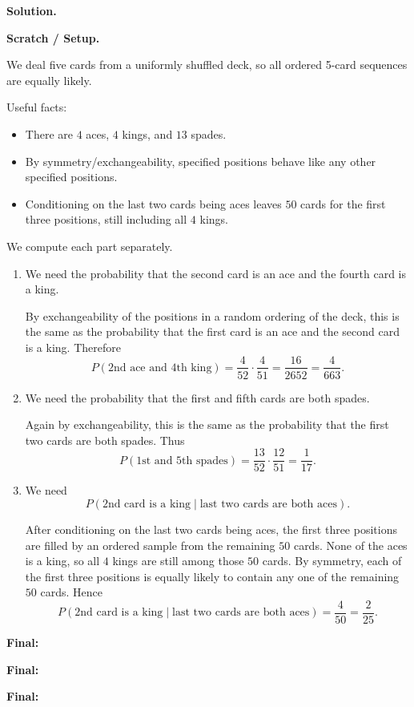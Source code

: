 \documentclass[12pt]{article}
\newenvironment{solution}{%
  \noindent\textbf{Solution.}\ \ignorespaces
}{\par}
\newenvironment{scratch}{%
  \begin{boxnote}\textbf{Scratch / Setup.}\ \small
}{\end{boxnote}}
\newcommand{\finalanswer}[1]{%
  \par\medskip
  \noindent\textbf{Final:}\ \fbox{$#1$}\par
} %
\begin{document}
\begin{solution}

\begin{scratch}
We deal five cards from a uniformly shuffled deck, so all ordered 5-card sequences
are equally likely.

Useful facts:
\begin{itemize}
  \item There are $4$ aces, $4$ kings, and $13$ spades.
  \item By symmetry/exchangeability, specified positions behave like any other
  specified positions.
  \item Conditioning on the last two cards being aces leaves $50$ cards for the
  first three positions, still including all $4$ kings.
\end{itemize}
\end{scratch}

We compute each part separately.

\begin{enumerate}[label=\textbf{(\alph*)}]
  \item We need the probability that the second card is an ace and the fourth card
  is a king.

  By exchangeability of the positions in a random ordering of the deck, this is the
  same as the probability that the first card is an ace and the second card is a king.
  Therefore
  \[
  P(\text{2nd ace and 4th king})
  =\frac{4}{52}\cdot\frac{4}{51}
  =\frac{16}{2652}
  =\frac{4}{663}.
  \]

  \item We need the probability that the first and fifth cards are both spades.

  Again by exchangeability, this is the same as the probability that the first two
  cards are both spades. Thus
  \[
  P(\text{1st and 5th spades})
  =\frac{13}{52}\cdot\frac{12}{51}
  =\frac{1}{17}.
  \]

  \item We need
  \[
  P(\text{2nd card is a king}\mid \text{last two cards are both aces}).
  \]

  After conditioning on the last two cards being aces, the first three positions are
  filled by an ordered sample from the remaining $50$ cards. None of the aces is a
  king, so all $4$ kings are still among those $50$ cards. By symmetry, each of the
  first three positions is equally likely to contain any one of the remaining $50$
  cards. Hence
  \[
  P(\text{2nd card is a king}\mid \text{last two cards are both aces})
  =\frac{4}{50}
  =\frac{2}{25}.
  \]
\end{enumerate}

\finalanswer{\text{(a)}\ \frac{4}{663}}
\finalanswer{\text{(b)}\ \frac{1}{17}}
\finalanswer{\text{(c)}\ \frac{2}{25}}

\end{solution}
\end{document}
